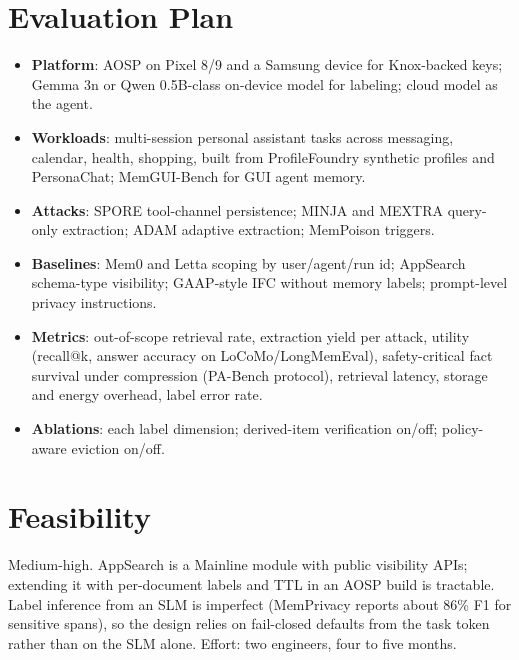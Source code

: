 \documentclass[11pt]{article}
\begin{document}
\section{Evaluation Plan}
\begin{itemize}
  \item \textbf{Platform}: AOSP on Pixel 8/9 and a Samsung device for Knox-backed keys; Gemma 3n or Qwen 0.5B-class on-device model for labeling; cloud model as the agent.
  \item \textbf{Workloads}: multi-session personal assistant tasks across messaging, calendar, health, shopping, built from ProfileFoundry synthetic profiles and PersonaChat; MemGUI-Bench for GUI agent memory.
  \item \textbf{Attacks}: SPORE tool-channel persistence; MINJA and MEXTRA query-only extraction; ADAM adaptive extraction; MemPoison triggers.
  \item \textbf{Baselines}: Mem0 and Letta scoping by user/agent/run id; AppSearch schema-type visibility; GAAP-style IFC without memory labels; prompt-level privacy instructions.
  \item \textbf{Metrics}: out-of-scope retrieval rate, extraction yield per attack, utility (recall@k, answer accuracy on LoCoMo/LongMemEval), safety-critical fact survival under compression (PA-Bench protocol), retrieval latency, storage and energy overhead, label error rate.
  \item \textbf{Ablations}: each label dimension; derived-item verification on/off; policy-aware eviction on/off.
\end{itemize}

\section{Feasibility}
Medium-high. AppSearch is a Mainline module with public visibility APIs; extending it with per-document labels and TTL in an AOSP build is tractable. Label inference from an SLM is imperfect (MemPrivacy reports about 86\% F1 for sensitive spans), so the design relies on fail-closed defaults from the task token rather than on the SLM alone. Effort: two engineers, four to five months.
\end{document}
